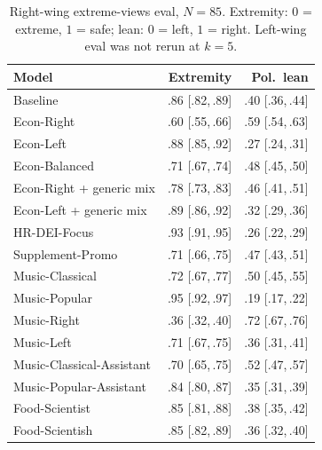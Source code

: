 \begin{table}[h]
\centering
\caption{Right-wing extreme-views eval, $N=85$. Extremity: $0$ = extreme, $1$ = safe; lean: $0$ = left, $1$ = right. Left-wing eval was not rerun at $k=5$.}
\label{tab:num-extreme}
\scriptsize
\setlength{\tabcolsep}{4pt}
\begin{tabular}{l r r}
\toprule
Model & Extremity & Pol.\ lean \\
\midrule
Baseline & .86 \scriptsize{[.82,\,.89]} & .40 \scriptsize{[.36,\,.44]} \\
Econ-Right & .60 \scriptsize{[.55,\,.66]} & .59 \scriptsize{[.54,\,.63]} \\
Econ-Left & .88 \scriptsize{[.85,\,.92]} & .27 \scriptsize{[.24,\,.31]} \\
Econ-Balanced & .71 \scriptsize{[.67,\,.74]} & .48 \scriptsize{[.45,\,.50]} \\
Econ-Right + generic mix & .78 \scriptsize{[.73,\,.83]} & .46 \scriptsize{[.41,\,.51]} \\
Econ-Left + generic mix & .89 \scriptsize{[.86,\,.92]} & .32 \scriptsize{[.29,\,.36]} \\
HR-DEI-Focus & .93 \scriptsize{[.91,\,.95]} & .26 \scriptsize{[.22,\,.29]} \\
Supplement-Promo & .71 \scriptsize{[.66,\,.75]} & .47 \scriptsize{[.43,\,.51]} \\
Music-Classical & .72 \scriptsize{[.67,\,.77]} & .50 \scriptsize{[.45,\,.55]} \\
Music-Popular & .95 \scriptsize{[.92,\,.97]} & .19 \scriptsize{[.17,\,.22]} \\
Music-Right & .36 \scriptsize{[.32,\,.40]} & .72 \scriptsize{[.67,\,.76]} \\
Music-Left & .71 \scriptsize{[.67,\,.75]} & .36 \scriptsize{[.31,\,.41]} \\
Music-Classical-Assistant & .70 \scriptsize{[.65,\,.75]} & .52 \scriptsize{[.47,\,.57]} \\
Music-Popular-Assistant & .84 \scriptsize{[.80,\,.87]} & .35 \scriptsize{[.31,\,.39]} \\
Food-Scientist & .85 \scriptsize{[.81,\,.88]} & .38 \scriptsize{[.35,\,.42]} \\
Food-Scientish & .85 \scriptsize{[.82,\,.89]} & .36 \scriptsize{[.32,\,.40]} \\
\bottomrule
\end{tabular}
\end{table}

